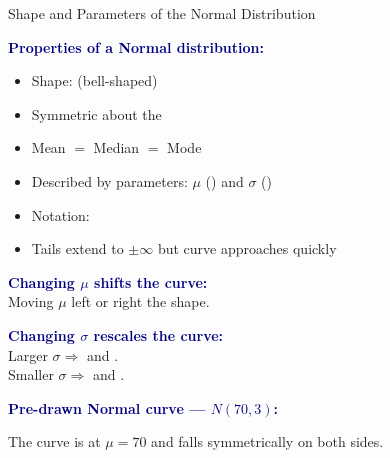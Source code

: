 \documentclass[10pt]{article}
\begin{document}
\boxguard
\begin{notesbox}{Shape and Parameters of the Normal Distribution}
\small
\begin{multicols}{2}

\textbf{\textcolor{navy}{Properties of a Normal distribution:}}
\begin{itemize}[itemsep=3pt]
  \item Shape: \blank{3.5cm} (bell-shaped)
  \item Symmetric about the \blank{2cm}
  \item Mean $=$ Median $=$ Mode
  \item Described by \blank{1.5cm} parameters:
        $\mu$ (\blank{1.8cm}) and $\sigma$ (\blank{2.5cm})
  \item Notation: \blank{3cm}
  \item Tails extend to $\pm\infty$ but curve
        approaches \blank{2cm} quickly
\end{itemize}

\vspace{6pt}
\textbf{\textcolor{navy}{Changing $\mu$ shifts the curve:}}\\
Moving $\mu$ left or right \blank{3cm} the shape.

\vspace{4pt}
\textbf{\textcolor{navy}{Changing $\sigma$ rescales the curve:}}\\
Larger $\sigma \Rightarrow$ \blank{3cm} and \blank{2cm}.\\
Smaller $\sigma \Rightarrow$ \blank{3cm} and \blank{2cm}.

\columnbreak

\textbf{\textcolor{navy}{Pre-drawn Normal curve — $N(70, 3)$:}}

\vspace{4pt}
\begin{center}
\end{center}

\vspace{4pt}
\small The curve is \blank{3cm} at $\mu = 70$
and falls symmetrically on both sides.

\end{multicols}
\end{notesbox}
\end{document}
